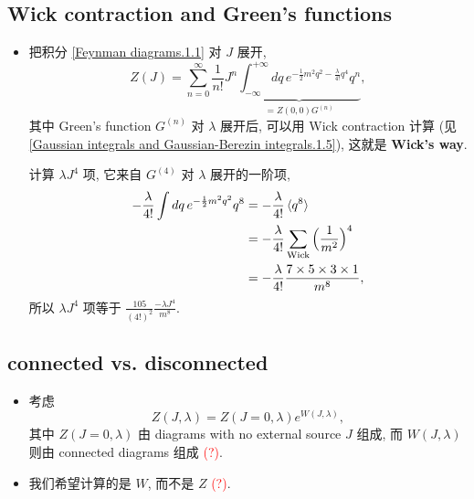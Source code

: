 \subsection{Wick contraction and Green's functions}
\begin{itemize}
	\item 把积分 \eqref{Feynman diagrams.1.1} 对 $J$ 展开,
	\begin{equation}
		Z(J) = \sum_{n = 0}^\infty \frac{1}{n!} J^n \underbrace{\int_{- \infty}^{+ \infty} dq \, e^{- \frac{1}{2} m^2 q^2 - \frac{\lambda}{4!} q^4} q^n}_{= Z(0, 0) G^{(n)}},
	\end{equation}
	其中 Green's function $G^{(n)}$ 对 $\lambda$ 展开后, 可以用 Wick contraction 计算 (见 \eqref{Gaussian integrals and Gaussian-Berezin integrals.1.5}), 这就是 \textbf{Wick's way}.
	
	\begin{tcolorbox}[title=calculation:]
		计算 $\lambda J^4$ 项, 它来自 $G^{(4)}$ 对 $\lambda$ 展开的一阶项,
		\begin{align}
			- \frac{\lambda}{4!} \int dq \, e^{- \frac{1}{2} m^2 q^2} q^8 &= - \frac{\lambda}{4!} \braket{q^8} \notag \\
			&= - \frac{\lambda}{4!} \sum_{\text{Wick}} \Big( \frac{1}{m^2} \Big)^4 \notag \\
			&= - \frac{\lambda}{4!} \frac{7 \times 5 \times 3 \times 1}{m^8}, \label{Feynman diagrams.1.5}
		\end{align}
		所以 $\lambda J^4$ 项等于 $\frac{105}{(4!)^2} \frac{- \lambda J^4}{m^8}$.
	\end{tcolorbox}
\end{itemize}

\subsection{connected vs. disconnected}
\begin{itemize}
	\item 考虑
	\begin{equation}
		Z(J, \lambda) = Z(J = 0, \lambda) e^{W(J, \lambda)},
	\end{equation}
	其中 $Z(J = 0, \lambda)$ 由 diagrams with no external source $J$ 组成, 而 $W(J, \lambda)$ 则由 connected diagrams 组成 \textcolor{red}{(?)}.
	
	\item 我们希望计算的是 $W$, 而不是 $Z$ \textcolor{red}{(?)}.
\end{itemize}

